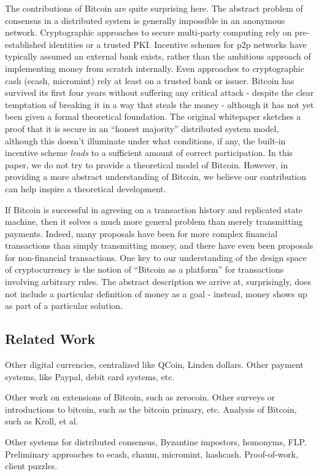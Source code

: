 The contributions of Bitcoin are quite surprising here. The abstract problem of consensus in a distributed system is generally impossible in an anonymous network. Cryptographic approaches to secure multi-party computing rely on pre-established identities or a trusted PKI. Incentive schemes for p2p networks have typically assumed an external bank exists, rather than the ambitious approach of implementing money from scratch internally. Even approaches to cryptographic cash (ecash, micromint) rely at least on a trusted bank or issuer. Bitcoin has survived its first four years without suffering any critical attack - despite the clear temptation of breaking it in a way that steals the money - although it has not yet been given a formal theoretical foundation. The original whitepaper sketches a proof that it is secure in an ``honest majority'' distributed system model, although this doesn't illuminate under what conditions, if any, the built-in incentive scheme {\em leads} to a sufficient amount of correct participation. In this paper, we do not try to provide a theoretical model of Bitcoin. However, in providing a more abstract understanding of Bitcoin, we believe our contribution can help inspire a theoretical development. 

If Bitcoin is successful in agreeing on a transaction history and replicated state machine, then it solves a much more general problem than merely transmitting payments. Indeed, many proposals have been for more complex financial transactions than simply transmitting money, and there have even been proposals for non-financial transactions. One key to our understanding of the design space of cryptocurrency is the notion of ``Bitcoin as a platform'' for transactions involving arbitrary rules. The abstract description we arrive at, surprisingly, does not include a particular definition of money as a goal - instead, money shows up as part of a particular solution. 

\subsection{Related Work}

Other digital currencies, centralized like QCoin, Linden dollars. Other payment systems, like Paypal, debit card systems, etc.

Other work on extensions of Bitcoin, such as zerocoin. Other surveys or introductions to bitcoin, such as the bitcoin primary, etc. Analysis of Bitcoin, such as Kroll, et al.

Other systems for distributed consensus, Byzantine impostors, homonyms, FLP. Preliminary approaches to ecash, chaum, micromint, hashcash.
Proof-of-work, client puzzles.
